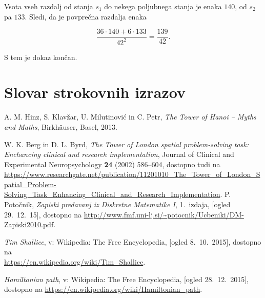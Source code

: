 \documentclass[12pt,a4paper]{amsart}
\theoremstyle{definition} %
\theoremstyle{plain} %
\newcommand{\geslo}[2]{\noindent\textbf{#1}\hspace*{3mm}\hangindent=\parindent\hangafter=1 #2}
\begin{document}
    Vsota vseh razdalj od stanja $s_1$ do nekega poljubnega stanja je enaka $140$, od $s_2$ pa $133$. Sledi, da je povprečna razdalja enaka
    
    \[ \frac{36 \cdot 140 + 6 \cdot 133}{{42}^2} = \frac{139}{42} .\]
    
    S tem je dokaz končan.
\endproof

\section*{Slovar strokovnih izrazov}

%
%

\begin{thebibliography}{99}

 A. M. Hinz, S. Klavžar, U. Milutinović in C. Petr, \emph{The Tower of Hanoi – Myths and Maths}, Birkhäuser, Basel, 2013.

W. K. Berg in D. L. Byrd, \emph{The Tower of London spatial problem-solving task: Enchancing clinical and research implementation}, Journal of Clinical and Experimental Neuropsychology \textbf{24} (2002) 586--604,
dostopno tudi na \\ \url{https://www.researchgate.net/publication/11201010_The_Tower_of_London_Spatial_Problem-Solving_Task_Enhancing_Clinical_and_Research_Implementation}.
 P. Potočnik, \emph{Zapiski predavanj iz Diskretne Matematike I}, 1.~izdaja, [ogled 29.~12.~15], dostopno na \url{http://www.fmf.uni-lj.si/~potocnik/Ucbeniki/DM-Zapiski2010.pdf}.

 \emph{Tim Shallice}, v: Wikipedia: The Free Encyclopedia, [ogled 8.~10.~2015], dostopno na\\ \url{https://en.wikipedia.org/wiki/Tim_Shallice}.

 \emph{Hamiltonian path}, v: Wikipedia: The Free Encyclopedia, [ogled 28.~12.~2015], dostopno na \url{https://en.wikipedia.org/wiki/Hamiltonian_path}.
\end{thebibliography}
\end{document}

